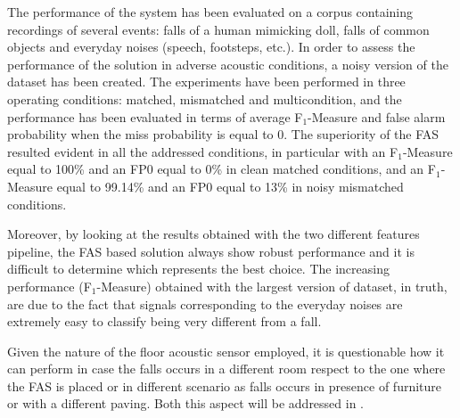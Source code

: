 The performance of the system has been evaluated on a corpus containing recordings of several events: falls of a human mimicking doll, falls of common objects and everyday noises (speech, footsteps, etc.). In order to assess the performance of the solution in adverse acoustic conditions, a noisy version of the dataset has been created. The experiments have been performed in three operating conditions: matched, mismatched and multicondition, and the performance has been evaluated in terms of average F$_1$-Measure and false alarm probability when the miss probability is equal to 0. The superiority of the FAS resulted evident in all the addressed conditions, in particular with an F$_1$-Measure equal to 100\%  and an FP0 equal to 0\% in clean matched conditions, and an F$_1$-Measure equal to 99.14\% and an FP0 equal to 13\% in noisy mismatched conditions.

Moreover, by looking at the results obtained with the two different features pipeline, the FAS based solution always show robust performance and it is difficult to determine which represents the best choice. 
The increasing performance (F$_1$-Measure) obtained with the largest version of dataset, in truth, are due to the fact that signals corresponding to the everyday noises are extremely easy to classify 
being very different from a fall.

Given the nature of the floor acoustic sensor employed, it is questionable how it can perform in case the falls occurs in a different room respect to the one where the FAS is placed or in different scenario as falls occurs in presence of furniture or with a different paving. Both this aspect will be addressed in . 
